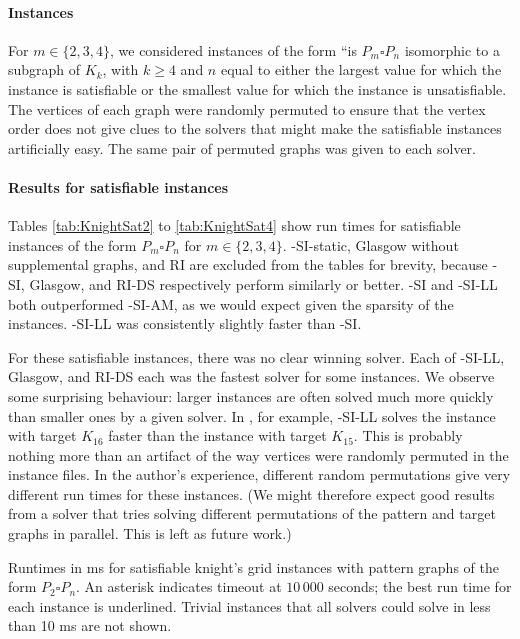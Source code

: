 \paragraph{Instances}

For $m \in \{2,3,4\}$, we considered instances of the form ``is $P_m \square P_n$ isomorphic
to a subgraph of $K_k$, with $k \geq 4$ and $n$ equal to either the largest value for which
the instance is satisfiable or the smallest value for which the instance is unsatisfiable.
The vertices of each graph were randomly permuted to ensure that the vertex
order does not give clues to the solvers that might make the satisfiable
instances artificially easy.  The same pair of permuted graphs was given to
each solver.

\paragraph{Results for satisfiable instances}
Tables \ref{tab:KnightSat2} to \ref{tab:KnightSat4} show run times for satisfiable instances
of the form $P_m \square P_n$ for $m \in \{2,3,4\}$.
\McSplit-SI-static, Glasgow without supplemental graphs, and RI are excluded from the tables for brevity,
because \McSplit-SI, Glasgow, and RI-DS respectively perform similarly or better.
\McSplit-SI and \McSplit-SI-LL both outperformed \McSplit-SI-AM, as we would expect given the
sparsity of the instances. \McSplit-SI-LL was consistently slightly faster than \McSplit-SI.

For these satisfiable instances, there was no clear winning solver. Each of
\McSplit-SI-LL, Glasgow, and RI-DS each was the fastest solver for some
instances.  We observe some surprising behaviour: larger instances are often
solved much more quickly than smaller ones by a given solver. In
, for example, \McSplit-SI-LL solves the instance with
target $K_{16}$ faster than the instance with target $K_{15}$.  This is
probably nothing more than an artifact of the way vertices were randomly
permuted in the instance files. In the author's experience, different random
permutations give very different run times for these instances.  (We might
therefore expect good results from a solver that tries solving different
permutations of the pattern and target graphs in parallel.  This is left as
future work.)

\begin{table}[htb]
\centering
\footnotesize
    
\caption{Runtimes in ms for satisfiable knight's grid instances with pattern graphs of
        the form $P_2 \square P_n$.  An asterisk indicates timeout at $10\,000$ seconds;
        the best run time for each instance is underlined.  Trivial instances that all solvers
        could solve in less than 10 ms are not shown.}
\label{tab:KnightSat2}
\end{table}


